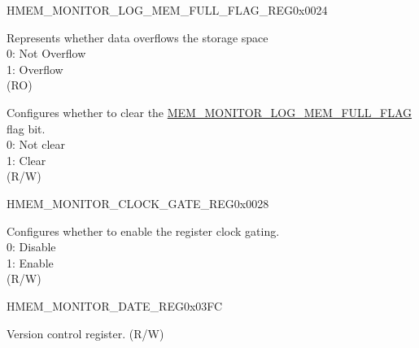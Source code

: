 \begin{register}{H}{MEM\_MONITOR\_LOG\_MEM\_FULL\_FLAG\_REG}{0x0024}\label{regdesc:MEMMONITORLOGMEMFULLFLAGREG}
%
%
%
\regnewline%
\begin{regdesc}\begin{reglist}
\label{fielddesc:MEMMONITORLOGMEMFULLFLAG}\item [MEM\_MONITOR\_LOG\_MEM\_FULL\_FLAG] Represents whether data overflows the storage space\\
0: Not Overflow\\
1: Overflow\\
(RO)
\label{fielddesc:MEMMONITORCLRLOGMEMFULLFLAG}\item [MEM\_MONITOR\_CLR\_LOG\_MEM\_FULL\_FLAG] Configures whether to clear the  \hyperref[fielddesc:MEMMONITORLOGMEMFULLFLAG]{MEM\_MONITOR\_LOG\_MEM\_FULL\_FLAG} flag bit. \\
0: Not clear\\
1: Clear\\
(R/W)
\end{reglist}\end{regdesc}
\end{register}


\begin{register}{H}{MEM\_MONITOR\_CLOCK\_GATE\_REG}{0x0028}\label{regdesc:MEMMONITORCLOCKGATEREG}
%
%
\regnewline%
\begin{regdesc}\begin{reglist}
\label{fielddesc:MEMMONITORCLKEN}\item [MEM\_MONITOR\_CLK\_EN] Configures whether to enable the register clock gating. \\
0: Disable\\
1: Enable\\
(R/W)
\end{reglist}\end{regdesc}
\end{register}


\begin{register}{H}{MEM\_MONITOR\_DATE\_REG}{0x03FC}\label{regdesc:MEMMONITORDATEREG}
%
%
\regnewline%
\begin{regdesc}\begin{reglist}
\label{fielddesc:MEMMONITORDATE}\item [MEM\_MONITOR\_DATE] Version control register. (R/W)
\end{reglist}\end{regdesc}
\end{register}
